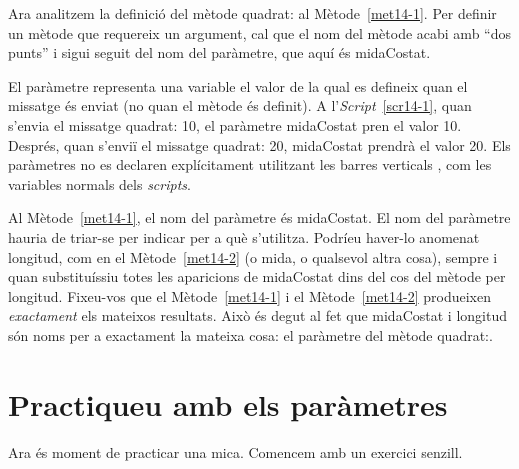 Ara analitzem la definició del mètode \textsf{quadrat:} al Mètode~\ref{met14-1}. Per definir un mètode que requereix un argument, cal que el nom del mètode acabi amb ``dos punts'' i sigui seguit del nom del paràmetre, que aquí és \textsf{midaCostat}.

El paràmetre representa una variable el valor de la qual es defineix quan el missatge és enviat (no quan el mètode és definit). A l'\emph{Script}~\ref{scr14-1}, quan s'envia el missatge \textsf{quadrat: 10}, el paràmetre \textsf{midaCostat} pren el valor \textsf{10}. Després, quan s'enviï el missatge \textsf{quadrat: 20}, \textsf{midaCostat} prendrà el valor \textsf{20}. Els paràmetres no es declaren explícitament utilitzant les barres verticals \textbar  \hspace{2mm} \textbar, com les variables normals dels \emph{scripts}.

Al Mètode~\ref{met14-1}, el nom del paràmetre és \textsf{midaCostat}. El nom del paràmetre hauria de triar-se per indicar per a què s'utilitza. Podríeu haver-lo anomenat \textsf{longitud}, com en el Mètode~\ref{met14-2} (o \textsf{mida}, o qualsevol altra cosa), sempre i quan substituíssiu totes les aparicions de \textsf{midaCostat} dins del cos del mètode per \textsf{longitud}. Fixeu-vos que el Mètode~\ref{met14-1} i el Mètode~\ref{met14-2} produeixen \emph{exactament} els mateixos resultats. Això és degut al fet que \textsf{midaCostat} i \textsf{longitud} són noms per a exactament la mateixa cosa: el paràmetre del mètode \textsf{quadrat:}.
\newpage
{}

\section{Practiqueu amb els paràmetres}
Ara és moment de practicar una mica. Comencem amb un exercici senzill.

